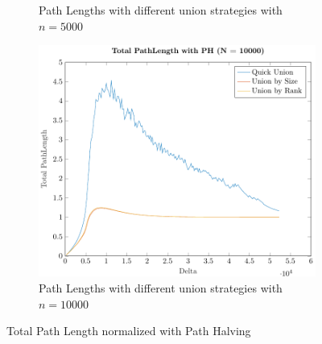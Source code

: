 \begin{figure}[ht]
\begin{subfigure}{0.32\textwidth}
        \caption{Path Lengths with different union strategies with $n = 5000$}
    \end{subfigure}%
    \hfill
    \begin{subfigure}{0.32\textwidth}
        \centering
        \includegraphics[width=\textwidth]{../images/plotPHFull10000_PathLength.pdf}
        \caption{Path Lengths with different union strategies with $n = 10000$}
    \end{subfigure}

    \caption{Total Path Length normalized with Path Halving}
    \label{fig:tplPH}
\end{figure}

